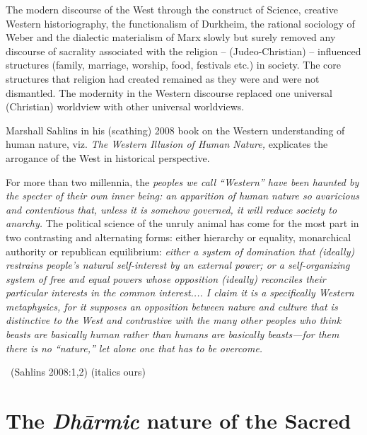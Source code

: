 The modern discourse of the West through the construct of Science, creative Western historiography, the functionalism of Durkheim, the rational sociology of Weber and the dialectic materialism of Marx slowly but surely removed any discourse of sacrality associated with the religion – (Judeo-Christian) – influenced structures (family, marriage, worship, food, festivals etc.) in society. The core structures that religion had created remained as they were and were not dismantled. The modernity in the Western discourse replaced one universal (Christian) worldview with other universal worldviews.

Marshall Sahlins in his (scathing) 2008 book on the Western understanding of human nature, viz. \textit{The Western Illusion of Human Nature,} explicates the arrogance of the West in historical perspective.

\begin{myquote}
For more than two millennia, the \textit{peoples we call “Western” have been haunted by the specter of their own inner being: an apparition of human nature so avaricious and contentious that, unless it is somehow governed, it will reduce society to anarchy.} The political science of the unruly animal has come for the most part in two contrasting and alternating forms: either hierarchy or equality, monarchical authority or republican equilibrium: \textit{either a system of domination that (ideally) restrains people's natural self-interest by an external power; or a self-organizing system of free and equal powers whose opposition (ideally) reconciles their particular interests in the common interest.... I claim it is a specifically Western metaphysics, for it supposes an opposition between nature and culture that is distinctive to the West and contrastive with the many other peoples who think beasts are basically human rather than humans are basically beasts—for them there is no “nature,” let alone one that has to be overcome.} 

~\hfill (Sahlins 2008:1,2) (italics ours)
\end{myquote}


\section*{The \textit{Dhārmic} nature of the Sacred}

